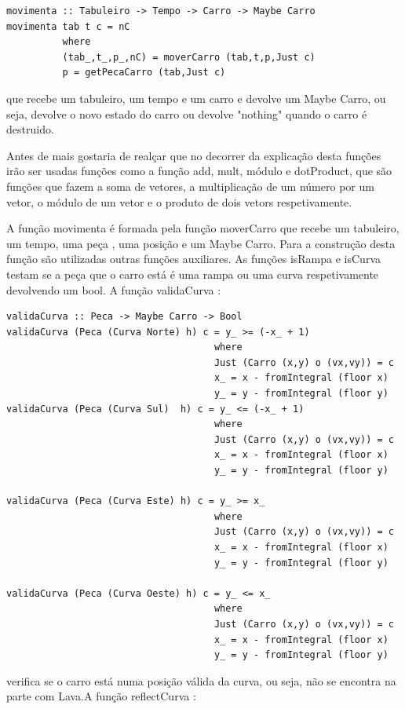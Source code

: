 \documentclass[a4paper]{report} %
\begin{document}
\begin{verbatim}
movimenta :: Tabuleiro -> Tempo -> Carro -> Maybe Carro
movimenta tab t c = nC
          where
          (tab_,t_,p_,nC) = moverCarro (tab,t,p,Just c)
          p = getPecaCarro (tab,Just c)
\end{verbatim}
que recebe um tabuleiro, um tempo e um carro e devolve um Maybe Carro, ou seja, devolve o novo estado do carro ou devolve "nothing" quando o carro é destruido.


Antes de mais gostaria de realçar que no decorrer da explicação desta funções irão ser usadas funções como a função add, mult, módulo e dotProduct, que são funções que fazem a soma de vetores, a multiplicação de um número por um vetor, o módulo de um vetor e o produto de dois vetors respetivamente.


A função movimenta é formada pela função moverCarro que recebe um tabuleiro, um tempo, uma peça , uma posição e um Maybe Carro.
Para a construção desta função são utilizadas outras funções auxiliares. As funções isRampa e isCurva testam se a peça que o carro está é uma rampa ou uma curva respetivamente devolvendo um bool. A função validaCurva :

\begin{verbatim}
validaCurva :: Peca -> Maybe Carro -> Bool
validaCurva (Peca (Curva Norte) h) c = y_ >= (-x_ + 1)
                                     where
                                     Just (Carro (x,y) o (vx,vy)) = c
                                     x_ = x - fromIntegral (floor x)
                                     y_ = y - fromIntegral (floor y)
validaCurva (Peca (Curva Sul)  h) c = y_ <= (-x_ + 1)
                                     where
                                     Just (Carro (x,y) o (vx,vy)) = c
                                     x_ = x - fromIntegral (floor x)
                                     y_ = y - fromIntegral (floor y)

validaCurva (Peca (Curva Este) h) c = y_ >= x_
                                     where
                                     Just (Carro (x,y) o (vx,vy)) = c
                                     x_ = x - fromIntegral (floor x)
                                     y_ = y - fromIntegral (floor y)

validaCurva (Peca (Curva Oeste) h) c = y_ <= x_
                                     where
                                     Just (Carro (x,y) o (vx,vy)) = c
                                     x_ = x - fromIntegral (floor x)
                                     y_ = y - fromIntegral (floor y)
\end{verbatim}
verifica se o carro está numa posição válida da curva, ou seja, não se encontra na parte com Lava.A função reflectCurva : 
\end{document}
